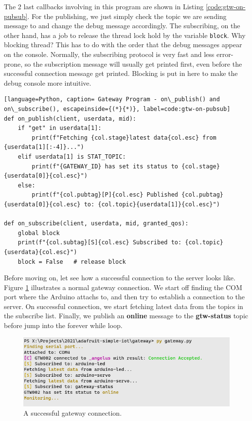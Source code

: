 The 2 last callbacks involving in this program are shown in Listing \ref{code:gtw-on-pubsub}. For the publishing, we just simply check the topic we are sending message to and change the debug message accordingly. The subscribing, on the other hand, has a job to release the thread lock hold by the variable \texttt{block}. Why blocking thread? This has to do with the order that the debug messages appear on the console. Normally, the subscribing protocol is very fast and less error-prone, so the subscription message will usually get printed first, even before the successful connection message get printed. Blocking is put in here to make the debug console more intuitive.
\begin{lstlisting}[language=Python, caption= Gateway Program - on\_publish() and on\_subscribe(), escapeinside={(*}{*)}, label=code:gtw-on-pubsub]
def on_publish(client, userdata, mid):
    if "get" in userdata[1]:
        print(f"Fetching {col.stage}latest data{col.esc} from {userdata[1][:-4]}...")
    elif userdata[1] is STAT_TOPIC:
        print(f"{GATEWAY_ID} has set its status to {col.stage}{userdata[0]}{col.esc}")
    else:
        print(f"{col.pubtag}[P]{col.esc} Published {col.pubtag}{userdata[0]}{col.esc} to: {col.topic}{userdata[1]}{col.esc}")

def on_subscribe(client, userdata, mid, granted_qos):
    global block
    print(f"{col.subtag}[S]{col.esc} Subscribed to: {col.topic}{userdata}{col.esc}")
    block = False   # release block
\end{lstlisting}

Before moving on, let see how a successful connection to the server looks like. Figure \ref{fig:gtw-normal} illustrates a normal gateway connection. We start off finding the COM port where the Arduino attachs to, and then try to establish a connection to the server. On successful connection, we start fetching latest data from the topics in the subscribe list. Finally, we publish an \textbf{online} message to the \textbf{gtw-status} topic before jump into the forever while loop.

\begin{figure}
    \centering
    \includegraphics[scale=0.8]{screenshots/normal.png}
    \caption{A successful gateway connection.}
    \label{fig:gtw-normal}
\end{figure}

